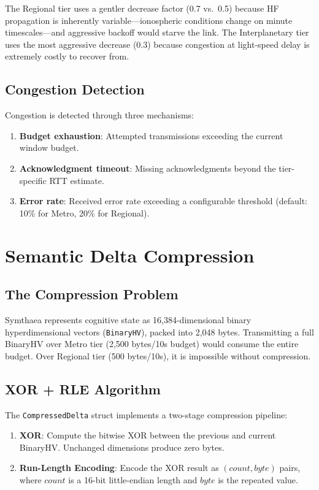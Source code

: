 \documentclass[11pt,twocolumn]{article}
\begin{document}
The Regional tier uses a gentler decrease factor (0.7 vs.\ 0.5) because
HF propagation is inherently variable---ionospheric conditions change on
minute timescales---and aggressive backoff would starve the link. The
Interplanetary tier uses the most aggressive decrease (0.3) because
congestion at light-speed delay is extremely costly to recover from.

\subsection{Congestion Detection}

Congestion is detected through three mechanisms:
\begin{enumerate}[nosep]
  \item \textbf{Budget exhaustion}: Attempted transmissions exceeding the
    current window budget.
  \item \textbf{Acknowledgment timeout}: Missing acknowledgments beyond
    the tier-specific RTT estimate.
  \item \textbf{Error rate}: Received error rate exceeding a configurable
    threshold (default: 10\% for Metro, 20\% for Regional).
\end{enumerate}

\section{Semantic Delta Compression}

\subsection{The Compression Problem}

Symthaea represents cognitive state as 16,384-dimensional binary
hyperdimensional vectors (\texttt{BinaryHV}), packed into 2,048 bytes.
Transmitting a full BinaryHV over Metro tier (2,500 bytes/10s budget)
would consume the entire budget. Over Regional tier (500 bytes/10s),
it is impossible without compression.

\subsection{XOR + RLE Algorithm}

The \texttt{CompressedDelta} struct implements a two-stage compression
pipeline:

\begin{enumerate}[nosep]
  \item \textbf{XOR}: Compute the bitwise XOR between the previous and
    current BinaryHV. Unchanged dimensions produce zero bytes.
  \item \textbf{Run-Length Encoding}: Encode the XOR result as
    $(count, byte)$ pairs, where $count$ is a 16-bit little-endian
    length and $byte$ is the repeated value.
\end{enumerate}
\end{document}
